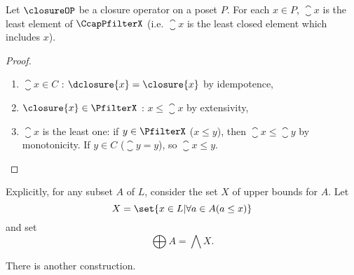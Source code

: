 \begin{proposition}
\label{closureLeast}
Let $\closureOP$ be a closure operator on a poset $P$.
For each $x \in P$, $\closure{x}$ is the least element of $\CcapPfilterX$
(i.e. 
$\closure{x}$ is the least closed element which includes $x$). 
\end{proposition}
\begin{proof}
\begin{enumerate}
\item $\closure{x} \in C$ : 
	$\dclosure{x} = \closure{x} $ by idempotence,
\item $\closure{x} \in \PfilterX$ : $x \leq \closure{x}$  by extensivity,
\item $\closure{x}$ is the least one: 
if $y \in \PfilterX$ ($x \leq y$),
then $\closure{x} \leq \closure{y}$ by monotonicity.
If $y \in C$  ($\closure{y} = y$), so $\closure{x} \leq y$.
\end{enumerate} 
\end{proof}

Explicitly, for any subset $A$ of $L$, consider the set  $X$ of upper bounds for $A$. 
Let
\[ X  =  \set{ x \in L |  \forall a \in A (a \leq x) } \]
and set
\[ \bigoplus A = \bigwedge X \mbox{.} \]

There is another construction. 
